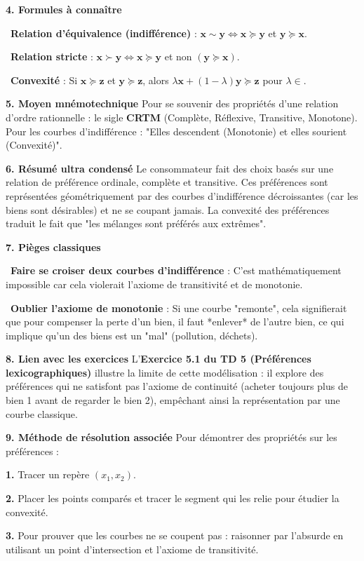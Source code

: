 \documentclass[11pt, a4paper]{report}
\begin{document}
\textbf{4. Formules à connaître}
\par \textbullet\ \textbf{Relation d'équivalence (indifférence)} : $\mathbf{x} \sim \mathbf{y} \iff \mathbf{x} \succeq \mathbf{y}$ et $\mathbf{y} \succeq \mathbf{x}$.
\par \textbullet\ \textbf{Relation stricte} : $\mathbf{x} \succ \mathbf{y} \iff \mathbf{x} \succeq \mathbf{y}$ et non $(\mathbf{y} \succeq \mathbf{x})$.
\par \textbullet\ \textbf{Convexité} : Si $\mathbf{x} \succeq \mathbf{z}$ et $\mathbf{y} \succeq \mathbf{z}$, alors $\lambda\mathbf{x} + (1-\lambda)\mathbf{y} \succeq \mathbf{z}$ pour $\lambda \in$.

\textbf{5. Moyen mnémotechnique}
Pour se souvenir des propriétés d'une relation d'ordre rationnelle : le sigle \textbf{CRTM} (Complète, Réflexive, Transitive, Monotone). 
Pour les courbes d'indifférence : "Elles descendent (Monotonie) et elles sourient (Convexité)".

\textbf{6. Résumé ultra condensé}
Le consommateur fait des choix basés sur une relation de préférence ordinale, complète et transitive. Ces préférences sont représentées géométriquement par des courbes d'indifférence décroissantes (car les biens sont désirables) et ne se coupant jamais. La convexité des préférences traduit le fait que "les mélanges sont préférés aux extrêmes".

\textbf{7. Pièges classiques}
\par \textbullet\ \textbf{Faire se croiser deux courbes d'indifférence} : C'est mathématiquement impossible car cela violerait l'axiome de transitivité et de monotonie.
\par \textbullet\ \textbf{Oublier l'axiome de monotonie} : Si une courbe "remonte", cela signifierait que pour compenser la perte d'un bien, il faut *enlever* de l'autre bien, ce qui implique qu'un des biens est un "mal" (pollution, déchets).

\textbf{8. Lien avec les exercices}
L'\textbf{Exercice 5.1 du TD 5 (Préférences lexicographiques)} illustre la limite de cette modélisation : il explore des préférences qui ne satisfont pas l'axiome de continuité (acheter toujours plus de bien 1 avant de regarder le bien 2), empêchant ainsi la représentation par une courbe classique.

\textbf{9. Méthode de résolution associée}
Pour démontrer des propriétés sur les préférences :
\par \textbf{1.} Tracer un repère $(x_1, x_2)$.
\par \textbf{2.} Placer les points comparés et tracer le segment qui les relie pour étudier la convexité.
\par \textbf{3.} Pour prouver que les courbes ne se coupent pas : raisonner par l'absurde en utilisant un point d'intersection et l'axiome de transitivité.
\end{document}
